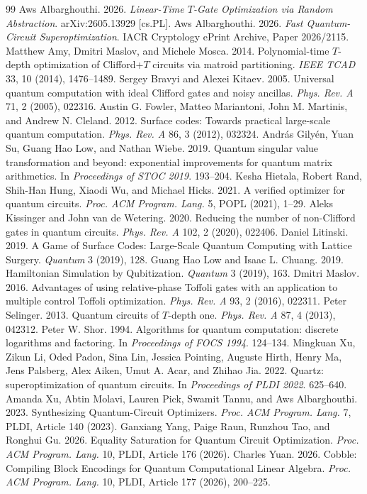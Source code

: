 \documentclass[11pt,a4paper]{article}
\theoremstyle{definition}
\begin{document}
\begin{thebibliography}{99}
 Aws Albarghouthi. 2026. \emph{Linear-Time $T$-Gate Optimization via Random Abstraction}. arXiv:2605.13929 [cs.PL].
 Aws Albarghouthi. 2026. \emph{Fast Quantum-Circuit Superoptimization}. IACR Cryptology ePrint Archive, Paper 2026/2115.
 Matthew Amy, Dmitri Maslov, and Michele Mosca. 2014. Polynomial-time $T$-depth optimization of Clifford+$T$ circuits via matroid partitioning. \emph{IEEE TCAD} 33, 10 (2014), 1476--1489.
 Sergey Bravyi and Alexei Kitaev. 2005. Universal quantum computation with ideal Clifford gates and noisy ancillas. \emph{Phys. Rev. A} 71, 2 (2005), 022316.
 Austin G. Fowler, Matteo Mariantoni, John M. Martinis, and Andrew N. Cleland. 2012. Surface codes: Towards practical large-scale quantum computation. \emph{Phys. Rev. A} 86, 3 (2012), 032324.
 Andr\'as Gily\'en, Yuan Su, Guang Hao Low, and Nathan Wiebe. 2019. Quantum singular value transformation and beyond: exponential improvements for quantum matrix arithmetics. In \emph{Proceedings of STOC 2019}. 193--204.
 Kesha Hietala, Robert Rand, Shih-Han Hung, Xiaodi Wu, and Michael Hicks. 2021. A verified optimizer for quantum circuits. \emph{Proc. ACM Program. Lang.} 5, POPL (2021), 1--29.
 Aleks Kissinger and John van de Wetering. 2020. Reducing the number of non-Clifford gates in quantum circuits. \emph{Phys. Rev. A} 102, 2 (2020), 022406.
 Daniel Litinski. 2019. A Game of Surface Codes: Large-Scale Quantum Computing with Lattice Surgery. \emph{Quantum} 3 (2019), 128.
 Guang Hao Low and Isaac L. Chuang. 2019. Hamiltonian Simulation by Qubitization. \emph{Quantum} 3 (2019), 163.
 Dmitri Maslov. 2016. Advantages of using relative-phase Toffoli gates with an application to multiple control Toffoli optimization. \emph{Phys. Rev. A} 93, 2 (2016), 022311.
 Peter Selinger. 2013. Quantum circuits of $T$-depth one. \emph{Phys. Rev. A} 87, 4 (2013), 042312.
 Peter W. Shor. 1994. Algorithms for quantum computation: discrete logarithms and factoring. In \emph{Proceedings of FOCS 1994}. 124--134.
 Mingkuan Xu, Zikun Li, Oded Padon, Sina Lin, Jessica Pointing, Auguste Hirth, Henry Ma, Jens Palsberg, Alex Aiken, Umut A. Acar, and Zhihao Jia. 2022. Quartz: superoptimization of quantum circuits. In \emph{Proceedings of PLDI 2022}. 625--640.
 Amanda Xu, Abtin Molavi, Lauren Pick, Swamit Tannu, and Aws Albarghouthi. 2023. Synthesizing Quantum-Circuit Optimizers. \emph{Proc. ACM Program. Lang.} 7, PLDI, Article 140 (2023).
 Ganxiang Yang, Paige Raun, Runzhou Tao, and Ronghui Gu. 2026. Equality Saturation for Quantum Circuit Optimization. \emph{Proc. ACM Program. Lang.} 10, PLDI, Article 176 (2026).
 Charles Yuan. 2026. Cobble: Compiling Block Encodings for Quantum Computational Linear Algebra. \emph{Proc. ACM Program. Lang.} 10, PLDI, Article 177 (2026), 200--225.
\end{thebibliography}
\end{document}
